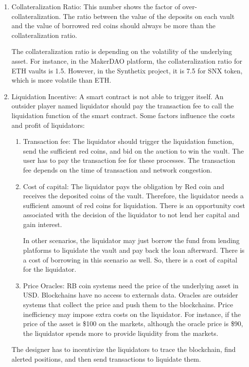 \begin{enumerate}
  \item Collateralization Ratio:
This number shows the factor of over-collateralization. The ratio between the value of the deposits on each vault and the value of borrowed red coins should always be more than the collateralization ratio.
  
The collateralization ratio is depending on the volatility of the underlying asset. For instance, in the MakerDAO platform, the collateralization ratio for ETH vaults is 1.5. However, in the Synthetix project, it is 7.5 for SNX token, which is more volatile than ETH.
  \item Liquidation Incentive:
A smart contract is not able to trigger itself. An outsider player named liquidator should pay the transaction fee to call the liquidation function of the smart contract. Some factors influence the costs and profit of liquidators:
\begin{enumerate}
	\item Transaction fee:
The liquidator should trigger the liquidation function, send the sufficient red coins, and bid on the auction to win the vault. The user has to pay the transaction fee for these processes. The transaction fee depends on the time of transaction and network congestion.  
	\item Cost of capital: The liquidator pays the obligation by Red coin and receives the deposited coins of the vault. Therefore, the liquidator needs a sufficient amount of red coins for liquidation. There is an opportunity cost associated with the decision of the liquidator to not lend her capital and gain interest.

In other scenarios, the liquidator may just borrow the fund from lending platforms to liquidate the vault and pay back the loan afterward. There is a cost of borrowing in this scenario as well. So, there is a cost of capital for the liquidator.
	\item Price Oracles: RB coin systems need the price of the underlying asset in USD. Blockchains have no access to externals data. Oracles are outsider systems that collect the price and push them to the blockchains. Price inefficiency may impose extra costs on the liquidator. For instance, if the price of the asset is \$100 on the markets, although the oracle price is \$90, the liquidator spends more to provide liquidity from the markets.
\end{enumerate}  

The designer has to incentivize the liquidators to trace the blockchain, find alerted positions, and then send transactions to liquidate them. 


\end{enumerate}
